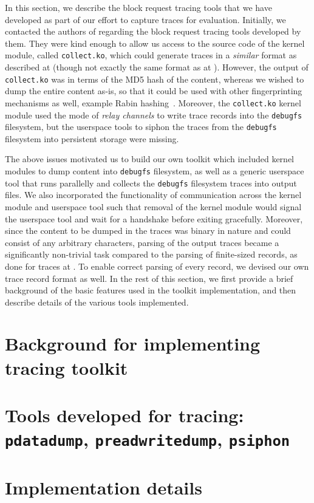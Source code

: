 In this section, we describe the block request tracing tools that we have
developed as part of our effort to capture traces for evaluation.
Initially, we contacted the authors of \cite{iodedup} 
regarding the block request tracing tools developed by them. They were
kind enough to allow us access to the source code of the kernel module,
called \texttt{collect.ko},
which could generate traces in a \textit{similar} format as
described at \cite{iodedup-online} (though not exactly the same format
as at \cite{iodedup-online}).
However, the output of \texttt{collect.ko} was in terms of the MD5 hash
of the content, whereas we wished to dump the entire content as-is, 
so that it could be used with other fingerprinting mechanisms as
well, example Rabin hashing~\cite{rabin}.
Moreover, the \texttt{collect.ko} kernel module used the mode of
\textit{relay channels}\cite{relayfs} to write trace records into the 
\texttt{debugfs}\cite{debugfs} filesystem, but the userspace tools to siphon 
the traces from the \texttt{debugfs} filesystem into persistent storage
were missing. 

The above issues motivated us to build our own toolkit which 
included kernel modules to dump content 
into \texttt{debugfs} filesystem, as well as a generic userspace tool
that runs parallelly and collects the \texttt{debugfs} filesystem traces
into output files. We also incorporated the functionality of 
communication across the kernel module and userspace tool such that
removal of the kernel module would signal the userspace tool and wait
for a handshake before exiting gracefully. 
Moreover, since the content to be dumped in the traces was binary in 
nature and could consist of any arbitrary characters, parsing of the
output traces became a significantly non-trivial task compared to the 
parsing of finite-sized records, as done for traces at \cite{iodedup-online}.
To enable correct parsing of every record, we devised our own trace 
record format as well.
In the rest of this section,
we first provide a brief background of the basic features used 
in the toolkit implementation, and then describe details of the
various tools implemented.

\section{Background for implementing tracing toolkit}
\label{sec:tracingchap-background}


\section{Tools developed for tracing: \texttt{pdatadump}, \texttt{preadwritedump}, \texttt{psiphon}}
\label{sec:tracingchap-tools}


\section{Implementation details}
\label{sec:tracingchap-implementation}

